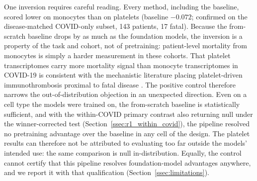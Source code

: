One inversion requires careful reading. Every method, including the baseline,
scored lower on monocytes than on platelets (baseline $-0.072$; confirmed on
the disease-matched COVID-only subset, 143 patients, 17 fatal). Because the
from-scratch baseline drops by as much as the foundation models, the inversion
is a property of the task and cohort, not of pretraining: patient-level
mortality from monocytes is simply a harder measurement in these cohorts. That
platelet transcriptomes carry more mortality signal than monocyte
transcriptomes in COVID-19 is consistent with the mechanistic literature
placing platelet-driven immunothrombosis proximal to fatal disease
\citep{manne2020platelet,barrett2021platelets}. The positive control therefore narrows the out-of-distribution
objection in an unexpected direction. Even on a cell type the models were
trained on, the from-scratch baseline is statistically sufficient, and with
the within-COVID primary contrast also returning null under the
winner-corrected test (Section~\ref{ssec:r1_within_covid}), the pipeline
resolved no pretraining advantage over the baseline in any cell of the
design. The platelet results can therefore not be attributed to evaluating
too far outside the models' intended use: the same comparison is null
in-distribution. Equally, the control cannot certify that this pipeline
resolves foundation-model advantages anywhere, and we report it with that
qualification (Section~\ref{ssec:limitations}).
